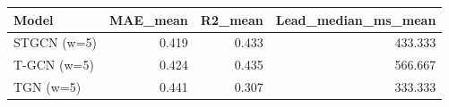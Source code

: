 \begin{tabular}{lrrr}
\toprule
Model & MAE\_mean & R2\_mean & Lead\_median\_ms\_mean \\
\midrule
STGCN (w=5) & 0.419 & 0.433 & 433.333 \\
T-GCN (w=5) & 0.424 & 0.435 & 566.667 \\
TGN (w=5) & 0.441 & 0.307 & 333.333 \\
\bottomrule
\end{tabular}